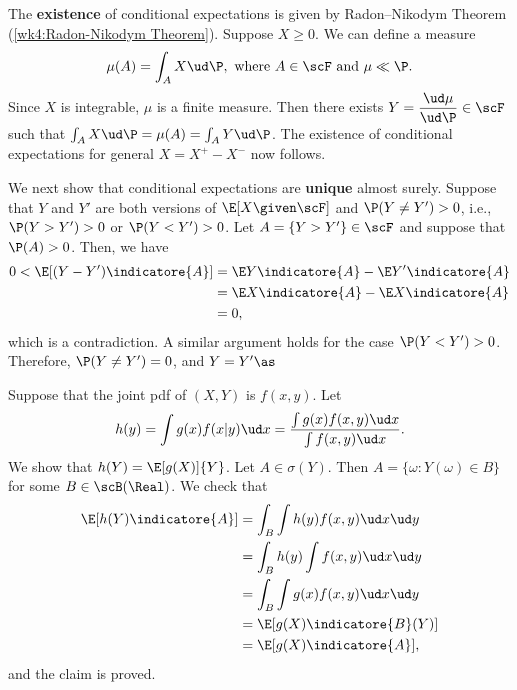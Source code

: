 \documentclass[../aipt.tex]{subfiles}
\begin{document}
The \textbf{existence} of conditional expectations is given by Radon–Nikodym Theorem (\cref{wk4:Radon-Nikodym Theorem}). Suppose $X\geq0$. We can define a measure
\begin{align*}
\mu(A)= \int_A X\ud \P, \text{ where $A\in\scF$ and } \mu \ll \P.
\end{align*}
Since $X$ is integrable, $\mu$ is a finite measure. Then there exists $Y= \dfrac{\ud \mu}{\ud \P} \in \scF$ such that $\int_A X\ud \P=\mu(A)=\int_A Y \ud \P$. The existence of conditional expectations for general $X = X^+-X^-$ now follows. 

We next show that conditional expectations are \textbf{unique} almost surely. Suppose that $Y$ and $Y'$ are both versions of $\E [X \given \scF]$ and $\P (Y\neq Y')>0$, i.e., $\P (Y> Y')>0$ or $\P (Y< Y')>0$. Let $A=\{Y>Y'\}\in \scF$ and suppose that $\P(A)>0$. Then, we have
\begin{align*}
0<\E[(Y-Y')\indicatore{A}] &= \E Y\indicatore{A}-\E Y'\indicatore{A}\\
&=\E X\indicatore{A} -\E X\indicatore{A}\\
&= 0, 
\end{align*}
which is a contradiction. A similar argument holds for the case $\P (Y< Y')>0$. Therefore, $\P (Y\neq Y')=0$, and $Y=Y' \as$


\begin{Example}\label{wk12:ex:jointpdf}
Suppose that the joint pdf of $(X,Y)$ is $f(x,y)$. Let 
\begin{align*}
h(y)=\int g(x)f(x|y)\ud x =\frac{\int g(x)f(x,y)\ud x}{\int f(x,y) \ud x}.
\end{align*}
We show that $h(Y)=\E[g(X)]{Y}$. Let $A \in \sigma(Y)$. Then $A=\{\omega:Y(\omega)\in B\}$ for some $B \in \scB(\Real)$. We check that
\begin{align*}
\E[h(Y)\indicatore{A}]
&=\int_B \int h(y) f(x,y)\ud x \ud y\\
&=\int_B h(y) \int f(x,y)\ud x \ud y\\
&=\int_B \int g(x)f(x,y)\ud x \ud y\\
&=\E [g(X)\indicatore{B}(Y)]\\
&=\E [g(X)\indicatore{A}],
\end{align*}
and the claim is proved.
\end{Example}
\end{document}
